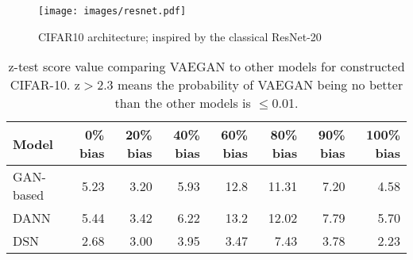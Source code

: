 \documentclass{article}
\newcommand\todo[1]{\textcolor{red}{#1}}
\begin{document}
\begin{figure}[t]
\centering
\texttt{[image: images/resnet.pdf]}
\caption{CIFAR10 architecture; inspired by the classical ResNet-20~\cite{he2016deep}}
\label{resnet} 
\end{figure}


\begin{table*}[t]
\centering
\caption{z-test score value comparing VAEGAN to other models for constructed CIFAR-10. z$>$2.3 means the probability of VAEGAN being no better than the other models is $\leq$0.01.}\label{appcifar10_z_score} %
\begin{tabular}{llllllll}
\hline
Model     & \multicolumn{1}{r}{0\% bias}  & \multicolumn{1}{r}{20\% bias }   & \multicolumn{1}{r}{40\% bias }   & \multicolumn{1}{r}{60\% bias}       & \multicolumn{1}{r}{80\% bias}       & \multicolumn{1}{r}{90\% bias}                    & \multicolumn{1}{r}{100\% bias}                  \\ \hline
GAN-based
& \multicolumn{1}{r}{\cellcolor[HTML]{E0DDDD}5.23 }
& \multicolumn{1}{r}{\cellcolor[HTML]{E0DDDD}3.20 }
& \multicolumn{1}{r}{\cellcolor[HTML]{E0DDDD}5.93 }
& \multicolumn{1}{r}{\cellcolor[HTML]{E0DDDD}12.8 } 
& \multicolumn{1}{r}{\cellcolor[HTML]{E0DDDD}11.31 }
& \multicolumn{1}{r}{\cellcolor[HTML]{E0DDDD}7.20} 
& \multicolumn{1}{r}{\cellcolor[HTML]{E0DDDD}4.58 } \\
DANN     
& \multicolumn{1}{r}{5.44 }      
& \multicolumn{1}{r}{3.42 }          
& \multicolumn{1}{r}{6.22 }      
& \multicolumn{1}{r}{13.2  }  
& \multicolumn{1}{r}{12.02  }   
& \multicolumn{1}{r}{7.79 }          
& \multicolumn{1}{r}{5.70  }                        \\
DSN     
& \multicolumn{1}{r}{\cellcolor[HTML]{E0DDDD}2.68 } 
& \multicolumn{1}{r}{\cellcolor[HTML]{E0DDDD}3.00 }
& \multicolumn{1}{r}{\cellcolor[HTML]{E0DDDD}3.95} 
& \multicolumn{1}{r}{\cellcolor[HTML]{E0DDDD}3.47 }  
& \multicolumn{1}{r}{\cellcolor[HTML]{E0DDDD}7.43}  
& \multicolumn{1}{r}{\cellcolor[HTML]{E0DDDD}3.78} 
& \multicolumn{1}{r}{\cellcolor[HTML]{E0DDDD}2.23 }\\ \hline
\end{tabular}
\end{table*}
\end{document}

